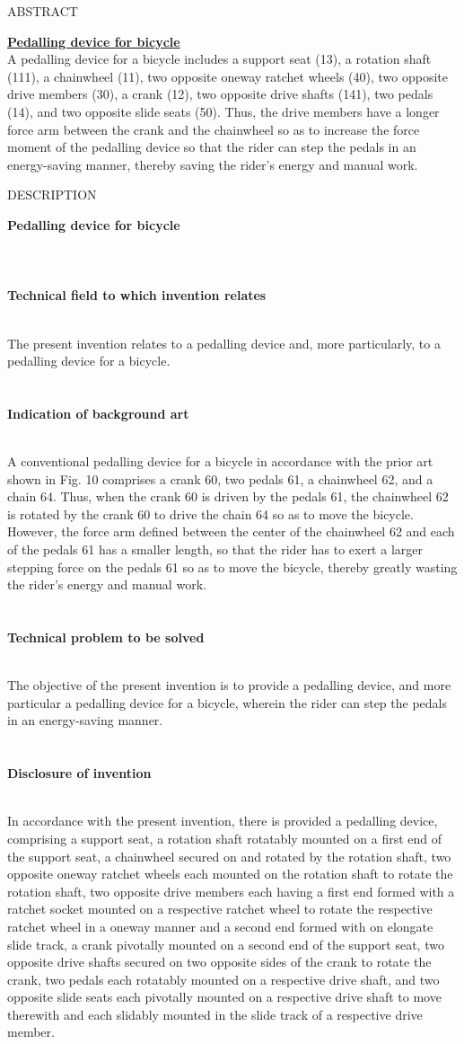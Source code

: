 \documentclass[10pt, a4paper]{article}
\newcommand{\mypatenttitle}[1]{\textbf{\underline{#1}}\\}
\newcommand{\myabstract}[1]{
	\begin{center}
		ABSTRACT
	\end{center}	
	\normalsize
	#1
}
\newcommand{\mydescription}[1]{
	\begin{center}
		DESCRIPTION
	\end{center}	
	\normalsize
	#1
}
\newcommand{\mydescriptionline}[2]{
	\textbf{#1}\\\\
	\normalsize
	#2\\\\
}
\begin{document}
	\myabstract{
		\mypatenttitle{Pedalling device for bicycle}
		
		A pedalling device for a bicycle includes a support seat (13), a rotation shaft (111), a chainwheel (11), two opposite oneway ratchet wheels (40), two opposite drive members (30), a crank (12), two opposite drive shafts (141), two pedals (14), and two opposite slide seats (50). Thus, the drive members have a longer force arm between the crank and the chainwheel so as to increase the force moment of the pedalling device so that the rider can step the pedals in an energy-saving manner, thereby saving the rider's energy and manual work.
	}
	
	\mydescription{
		\mydescriptionline{Pedalling device for bicycle}{ }	
		\mydescriptionline{Technical field to which invention relates}{
			The present invention relates to a pedalling device and, more particularly, to a pedalling
			device for a bicycle.
		}	\\
		\mydescriptionline{Indication of background art}{
			A conventional pedalling device for a bicycle in accordance with the prior art shown in Fig. 10 comprises a crank 60, two pedals 61, a chainwheel 62, and a chain 64. Thus, when the	crank 60 is driven by the pedals 61, the chainwheel 62 is rotated by the crank 60 to drive the chain 64 so as to move the bicycle. However, the force arm defined between the center of the chainwheel 62 and each of the pedals 61 has a smaller length, so that the rider has to exert a larger stepping force on the pedals 61 so as to move the bicycle, thereby greatly wasting the rider's energy and manual work. 
		}	\\
		\mydescriptionline{Technical problem to be solved}{
			The objective of the present invention is to provide a pedalling device, and more particular a pedalling device for a bicycle, wherein the rider can step the pedals in an energy-saving manner. 
		}	\\
		\mydescriptionline{Disclosure of invention}{
			In accordance with the present invention, there is provided a pedalling device, comprising
			a support seat, a rotation shaft rotatably mounted on a first end of the support seat, a
			chainwheel secured on and rotated by the rotation shaft, two opposite oneway ratchet
			wheels each mounted on the rotation shaft to rotate the rotation shaft, two opposite drive
			members each having a first end formed with a ratchet socket mounted on a respective
			ratchet wheel to rotate the respective ratchet wheel in a oneway manner and a second end
			formed with on elongate slide track, a crank pivotally mounted on a second end of the
			support seat, two opposite drive shafts secured on two opposite sides of the crank to
			rotate the crank, two pedals each rotatably mounted on a respective drive shaft, and two
			opposite slide seats each pivotally mounted on a respective drive shaft to move therewith
			and each slidably mounted in the slide track of a respective drive member. \newline
			
}}
\end{document}
